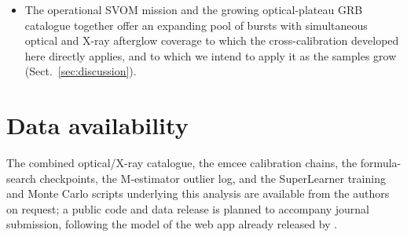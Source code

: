\documentclass{aa}
\begin{document}
\begin{itemize}
  $r_{\log}=0.650$ ($N=189$) versus the baseline's $0.720$ ($N=204$), and the
  donor-matched OT-fusion combination through the same baseline SuperLearner
  reaches $r_{\log}=0.630$ ($N=208$) (Table~\ref{tab:cv-compare}). The
  augmented result is consistent with sample size, rather than ensemble
  architecture, being the binding constraint on performance at the currently
  available LGRB sample sizes.
\item The operational SVOM mission and the growing optical-plateau GRB
  catalogue together offer an expanding pool of bursts with simultaneous
  optical and X-ray afterglow coverage to which the cross-calibration
  developed here directly applies, and to which we intend to apply it as the
  samples grow (Sect.~\ref{sec:discussion}).
\end{itemize}

\section{Data availability}
\label{sec:data-availability}

The combined optical/X-ray catalogue, the emcee calibration chains, the
formula-search checkpoints, the M-estimator outlier log, and the SuperLearner
training and Monte Carlo scripts underlying this analysis are available from
the authors on request; a public code and data release is planned to
accompany journal submission, following the model of the web app already
released by \citet{narendra2025}.
\end{document}
